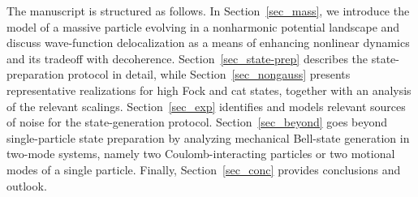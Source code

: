 \documentclass[reprint,prx,footinbib,floatfix,twocolumn,longbibliography,superscriptaddress]{revtex4-2}
\begin{document}
The manuscript is structured as follows.
In Section~\ref{sec_mass}, we introduce the model of a massive particle evolving in a nonharmonic potential landscape and discuss wave-function delocalization as a means of enhancing nonlinear dynamics and its tradeoff with decoherence. 
Section~\ref{sec_state-prep} describes the state-preparation protocol in detail, while Section~\ref{sec_nongauss} presents representative realizations for high Fock and cat states, together with an analysis of the relevant scalings.
Section~\ref{sec_exp} identifies and models relevant sources of noise for the state-generation protocol.
Section~\ref{sec_beyond} goes beyond single-particle state preparation by analyzing mechanical Bell-state generation in two-mode systems, namely two Coulomb-interacting particles or two motional modes of a single particle.
Finally, Section~\ref{sec_conc} provides conclusions and outlook.
\end{document}
